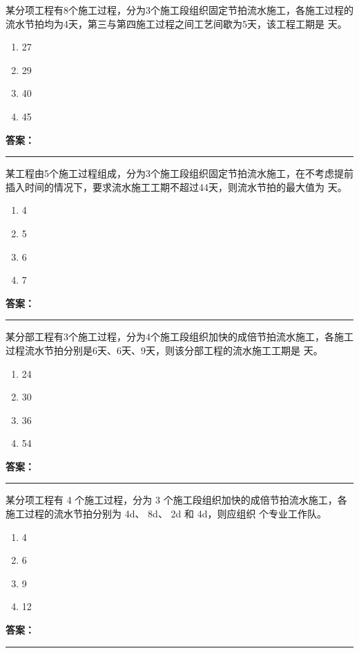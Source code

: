 \documentclass[UTF8,fontset=fandol,11pt]{ctexart}
\newcommand{\answerline}{\textcolor{answerred}{\rule{2.4cm}{0.7pt}}}
\begin{document}
\begin{quizbox}[title={第 11 题}]
某分项工程有8个施工过程，分为3个施工段组织固定节拍流水施工，各施工过程的流水节拍均为4天，第三与第四施工过程之间工艺间歇为5天，该工程工期是 天。\\
\begin{enumerate}[label=\Alph*.]
\item 27
\item 29
\item 40
\item 45
\end{enumerate}
\textbf{\textcolor{answerred}{答案：}} \answerline
\end{quizbox}

\begin{quizbox}[title={第 12 题}]
某工程由5个施工过程组成，分为3个施工段组织固定节拍流水施工，在不考虑提前插入时间的情况下，要求流水施工工期不超过44天，则流水节拍的最大值为 天。\\
\begin{enumerate}[label=\Alph*.]
\item 4
\item 5
\item 6
\item 7
\end{enumerate}
\textbf{\textcolor{answerred}{答案：}} \answerline
\end{quizbox}

\begin{quizbox}[title={第 13 题}]
某分部工程有3个施工过程，分为4个施工段组织加快的成倍节拍流水施工，各施工过程流水节拍分别是6天、6天、9天，则该分部工程的流水施工工期是 天。\\
\begin{enumerate}[label=\Alph*.]
\item 24
\item 30
\item 36
\item 54
\end{enumerate}
\textbf{\textcolor{answerred}{答案：}} \answerline
\end{quizbox}

\begin{quizbox}[title={第 14 题}]
某分项工程有 4 个施工过程，分为 3 个施工段组织加快的成倍节拍流水施工，各施工过程的流水节拍分别为 4d、 8d、 2d 和 4d，则应组织 个专业工作队。\\
\begin{enumerate}[label=\Alph*.]
\item 4
\item 6
\item 9
\item 12
\end{enumerate}
\textbf{\textcolor{answerred}{答案：}} \answerline
\end{quizbox}
\end{document}
